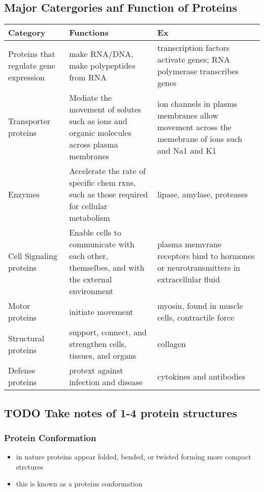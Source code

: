 \documentclass[11pt]{article}
\begin{document}
\subsection{Major Catergories anf Function of Proteins}
\label{sec:orgd09e2ba}
\begin{center}
\begin{tabular}{lll}
Category & Functions & Ex\\
\hline
Proteins that regulate gene expression & make RNA/DNA, make polypeptides from RNA & transcription factors activate genes; RNA polymerase transcribes genes\\
Transporter proteins & Mediate the movement of solutes such as ions and organic molecules across plasma membranes & ion channels in plasms membranes allow movement across the memebrane of ions such and Na1 and K1\\
Enzymes & Accelerate the rate of specific chem rxns, such as those required for cellular metabolism & lipase, amylase, proteases\\
Cell Signaling proteins & Enable cells to communicate with each other, themselbes, and with the external environment & plasma memvrane receptors bind to hormones or neurotransmitters in extracellular fluid\\
Motor proteins & initiate movement & myosin, found in muscle cells, contractile force\\
Structural proteins & support, connect, and strengthen cells, tissues, and organs & collagen\\
Defense proteins & protext against infection and disease & cytokines and antibodies\\
\end{tabular}
\end{center}
\subsection{{\bfseries\sffamily TODO} Take notes of 1-4 protein structures}
\label{sec:orgde4eb31}
\subsubsection{Protein Conformation}
\label{sec:org5691e7e}
\begin{itemize}
\item in nature proteins appear folded,  bended, or twisted forming more compact strctures
\item this is known as a proteins conformation
\end{itemize}
\end{document}
